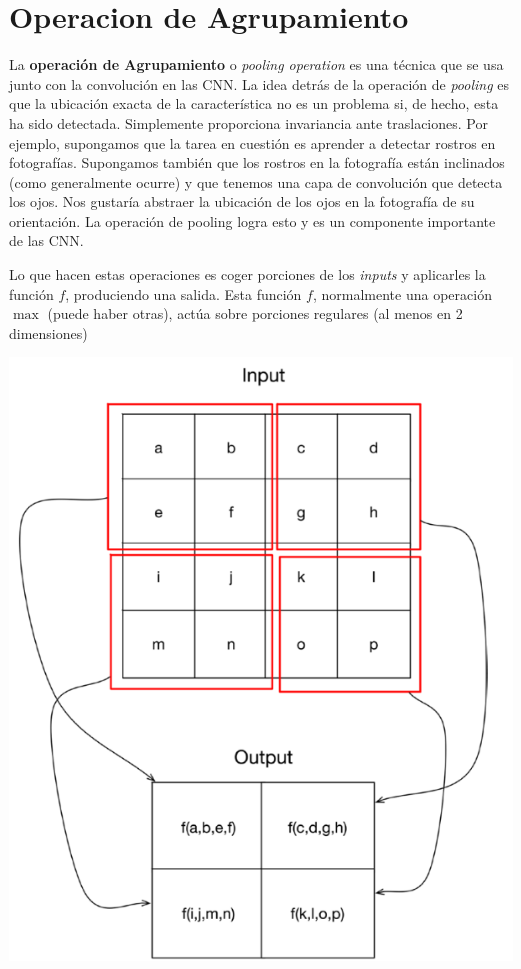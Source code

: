\section{Operacion de Agrupamiento}

\begin{minipage}{0.5\linewidth}
La \textbf{operación de Agrupamiento} o \textit{pooling operation} es una técnica que se usa junto con la convolución en las CNN. La idea detrás de la operación de \textit{pooling} es que la ubicación exacta de la característica no es un problema si, de hecho, esta ha sido detectada. Simplemente proporciona invariancia ante traslaciones. Por ejemplo, supongamos que la tarea en cuestión es aprender a detectar rostros en fotografías. Supongamos también que los rostros en la fotografía están inclinados (como generalmente ocurre) y que tenemos una capa de convolución que detecta los ojos. Nos gustaría abstraer la ubicación de los ojos en la fotografía de su orientación. La operación de pooling logra esto y es un componente importante de las CNN.

\vspace*{0.6em}

Lo que hacen estas operaciones es coger porciones de los \textit{inputs} y aplicarles la función $f$, produciendo una salida. Esta función $f$, normalmente una operación $\max$ (puede haber otras), actúa sobre porciones regulares (al menos en 2 dimensiones) 
\end{minipage} \hfill
\begin{minipage}{0.45\linewidth}
    \includegraphics[width=1\linewidth]{Imagenes/04/Pooling.png}  
    \label{Fig:04-pooling}
\end{minipage}


